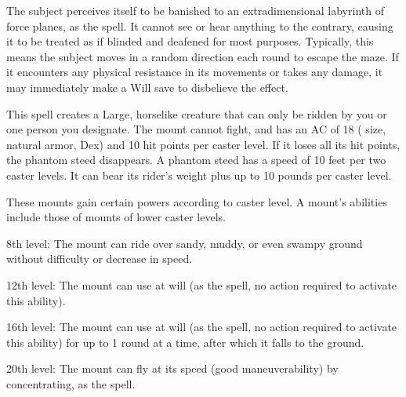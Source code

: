 \spellrng{\rngclose}
\spelldur{\durmed}
\begin{spelleffect}
  The subject perceives itself to be banished to an extradimensional labyrinth of force planes, as the  spell. It cannot see or hear anything to the contrary, causing it to be treated as if blinded and deafened for most purposes. Typically, this means the subject moves in a random direction each round to escape the maze. If it encounters any physical resistance in its movements or takes any damage, it may immediately make a Will save to disbelieve the effect.
\end{spelleffect}

\spellrng{\rngclose}
\begin{spelleffect}
  This spell creates a Large, horselike creature that can only be ridden by you or one person you designate. The mount cannot fight, and has an AC of 18 ( size,  natural armor,  Dex) and 10 hit points  per caster level. If it loses all its hit points, the phantom steed disappears. A phantom steed has a speed of 10 feet per two caster levels. It can bear its rider's weight plus up to 10 pounds per caster level.
  \par These mounts gain certain powers according to caster level. A mount's abilities include those of mounts of lower caster levels. 
  \par 8th level: The mount can ride over sandy, muddy, or even swampy ground without difficulty or decrease in speed.

  \par 12th level: The mount can use  at will (as the spell, no action required to activate this ability).

  \par 16th level: The mount can use  at will (as the spell, no action required to activate this ability) for up to 1 round at a time, after which it falls to the ground.

  \par 20th level: The mount can fly at its speed (good maneuverability) by concentrating, as the  spell.
\end{spelleffect}

